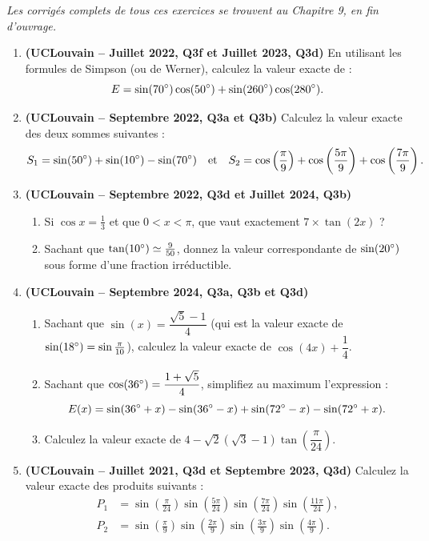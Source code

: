\emph{Les corrigés complets de tous ces exercices se trouvent au Chapitre 9, en fin d'ouvrage.}

\begin{enumerate}[label=\textbf{Exercice 2.\arabic* --}, align=left, leftmargin=*]
    \item \textbf{(UCLouvain -- Juillet 2022, Q3f et Juillet 2023, Q3d)} En utilisant les formules de Simpson (ou de Werner), calculez la valeur exacte de :
    \[
        E = \sin(70\degree)\cos(50\degree) + \sin(260\degree)\cos(280\degree).
    \]

    \item \textbf{(UCLouvain -- Septembre 2022, Q3a et Q3b)} Calculez la valeur exacte des deux sommes suivantes :
    \[
        S_1 = \sin(50\degree) + \sin(10\degree) - \sin(70\degree) \quad \text{et} \quad S_2 = \cos\left(\frac{\pi}{9}\right) + \cos\left(\frac{5\pi}{9}\right) + \cos\left(\frac{7\pi}{9}\right).
    \]

    \item \textbf{(UCLouvain -- Septembre 2022, Q3d et Juillet 2024, Q3b)}
    \begin{enumerate}
        \item Si $\cos x = \frac{1}{3}$ et que $0 < x < \pi$, que vaut exactement $7 \times \tan(2x)$ ?
        \item Sachant que $\tan(10\degree) \simeq \frac{9}{50}$, donnez la valeur correspondante de $\sin(20\degree)$ sous forme d'une fraction irréductible.
    \end{enumerate}

    \item \textbf{(UCLouvain -- Septembre 2024, Q3a, Q3b et Q3d)}
    \begin{enumerate}
        \item Sachant que $\sin(x) = \dfrac{\sqrt{5}-1}{4}$ (qui est la valeur exacte de $\sin(18\degree) = \sin\frac{\pi}{10}$), calculez la valeur exacte de $\cos(4x) + \dfrac{1}{4}$.
        \item Sachant que $\cos(36\degree) = \dfrac{1+\sqrt{5}}{4}$, simplifiez au maximum l'expression :
        \[
            E(x) = \sin(36\degree + x) - \sin(36\degree - x) + \sin(72\degree - x) - \sin(72\degree + x).
        \]
        \item Calculez la valeur exacte de $4 - \sqrt{2}(\sqrt{3}-1)\tan\left(\dfrac{\pi}{24}\right)$.
    \end{enumerate}

    \item \textbf{(UCLouvain -- Juillet 2021, Q3d et Septembre 2023, Q3d)} Calculez la valeur exacte des produits suivants :
    \begin{align*}
        P_1 &= \sin\left(\frac{\pi}{24}\right)\sin\left(\frac{5\pi}{24}\right)\sin\left(\frac{7\pi}{24}\right)\sin\left(\frac{11\pi}{24}\right), \\
        P_2 &= \sin\left(\frac{\pi}{9}\right)\sin\left(\frac{2\pi}{9}\right)\sin\left(\frac{3\pi}{9}\right)\sin\left(\frac{4\pi}{9}\right).
    \end{align*}


\end{enumerate}
